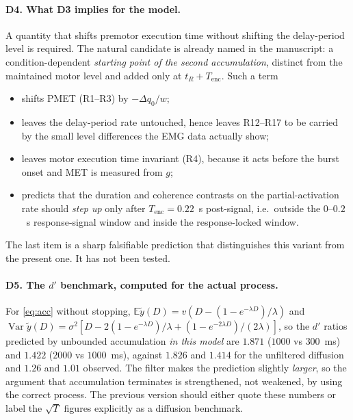 \documentclass[11pt,a4paper]{article}
\newcommand{\E}{\mathbb{E}}
\newcommand{\Var}{\operatorname{Var}}
\theoremstyle{plain}
\theoremstyle{remark}
\begin{document}
\paragraph{D4. What D3 implies for the model.}
A quantity that shifts premotor execution time without shifting the delay-period level is
required. The natural candidate is already named in the manuscript: a condition-dependent
\emph{starting point of the second accumulation}, distinct from the maintained motor level
and added only at $t_R+T_{\text{enc}}$. Such a term
\begin{itemize}
\item shifts PMET (R1--R3) by $-\Delta q_0/w$;
\item leaves the delay-period rate untouched, hence leaves R12--R17 to be carried by the
small level differences the EMG data actually show;
\item leaves motor execution time invariant (R4), because it acts before the burst onset
and MET is measured from $g$;
\item predicts that the duration and coherence contrasts on the partial-activation rate
should \emph{step up} only after $T_{\text{enc}}=0.22$~s post-signal, i.e.\ outside the
$0$--$0.2$~s response-signal window and inside the response-locked window.
\end{itemize}
The last item is a sharp falsifiable prediction that distinguishes this variant from the
present one. It has not been tested.

\paragraph{D5. The $d'$ benchmark, computed for the actual process.}
For \eqref{eq:acc} without stopping,
$\E\tilde y(D)=v(D-(1-e^{-\lambda D})/\lambda)$ and
$\Var\tilde y(D)=\sigma^2[D-2(1-e^{-\lambda D})/\lambda+(1-e^{-2\lambda D})/(2\lambda)]$,
so the $d'$ ratios predicted by unbounded accumulation \emph{in this model} are
$1.871$ ($1000$ vs $300$~ms) and $1.422$ ($2000$ vs $1000$~ms), against $1.826$ and
$1.414$ for the unfiltered diffusion and $1.26$ and $1.01$ observed. The filter makes the
prediction slightly \emph{larger}, so the argument that accumulation terminates is
strengthened, not weakened, by using the correct process. The previous version should
either quote these numbers or label the $\sqrt{T}$ figures explicitly as a diffusion
benchmark.
\end{document}
